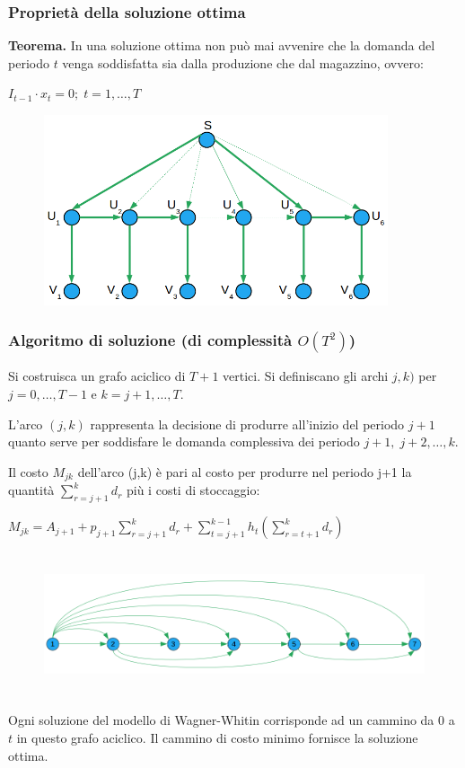 \subsubsection{Proprietà della soluzione ottima}
\textbf{Teorema.} In una soluzione ottima non può mai avvenire che la domanda del periodo $t$ venga soddisfatta sia dalla produzione che dal magazzino, ovvero:
\begin{center}
	$I_{t-1}\cdot x_{t}=0;\;t=1,\dots,T$
\end{center}
\begin{figure}[H]
	\caption{}
	\centering
	\includegraphics[height=5.6cm]{images/graph4.png}
	\label{fig:PossibileSoluzione}
\end{figure}

\subsubsection{Algoritmo di soluzione (di complessità $O(T^{2})$)}
Si costruisca un grafo aciclico di $T+1$ vertici.\newline
Si definiscano gli archi $j,k)$ per $j=0,\dots,T-1$ e $k=j+1,\dots,T$.

L'arco $(j,k)$ rappresenta la decisione di produrre all'inizio del periodo $j+1$ quanto serve per soddisfare le domanda complessiva dei periodo $j+1,\;j+2,\dots,k$.

Il costo $M_{jk}$ dell'arco (j,k) è pari al costo per produrre nel periodo j+1 la quantità $\sum_{r=j+1}^{k}d_{r}$ più i costi di stoccaggio:
\begin{center}
	$M_{jk}=A_{j+1}+p_{j+1}\sum_{r=j+1}^{k}d_{r}+\sum_{t=j+1}^{k-1}h_{t}(\sum_{r=t+1}^{k}d_{r})$
\end{center}
\begin{figure}[H]
	\caption{}
	\centering
	\includegraphics[height=4.2cm]{images/graph5.png}
	\label{fig:PossibileSoluzione2}
\end{figure}

Ogni soluzione del modello di Wagner-Whitin corrisponde ad un cammino da $0$ a $t$ in questo grafo aciclico.\newline
Il cammino di costo minimo fornisce la soluzione ottima.